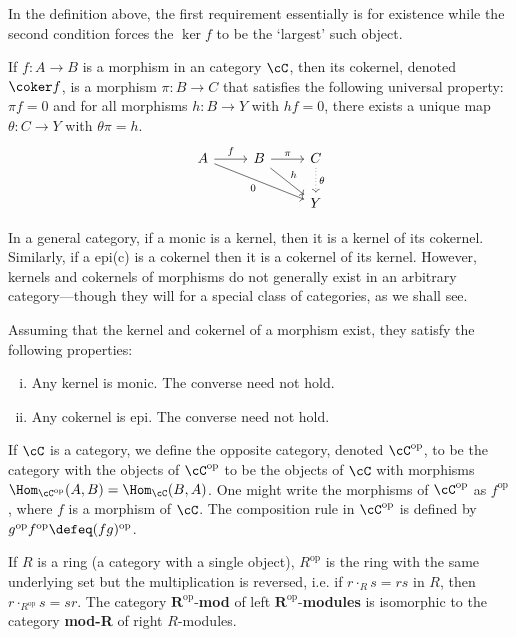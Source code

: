 \noindent In the definition above, the first requirement essentially is for existence while the second condition forces the $\ker f$ to be the `largest' such object. 


\begin{dfn}[Cokernel]
If $f: A \to B$ is a morphism in an category $\cC$, then its cokernel, denoted $\coker f$, is a morphism $\pi: B \to C$ that satisfies the following universal property: $\pi f=0$ and for all morphisms $h: B \to Y$ with $hf=0$, there exists a unique map $\theta: C \to Y$ with $\theta\pi=h$.
	\[
	\begin{tikzcd}
	A \arrow{r}{f} \arrow[swap]{rrd}{0} & B \arrow{r}{\pi} \arrow{dr}{h} & C \arrow[dotted]{d}{\theta} \\ 
	& & Y 
	\end{tikzcd}
	\]
\end{dfn}


In a general category, if a monic is a kernel, then it is a kernel of its cokernel. Similarly, if a epi(c) is a cokernel then it is a cokernel of its kernel. However, kernels and cokernels of morphisms do not generally exist in an arbitrary category---though they will for a special class of categories, as we shall see.


\begin{prop}
Assuming that the kernel and cokernel of a morphism exist, they satisfy the following properties:
	\begin{enumerate}[(i)]
	\item Any kernel is monic. The converse need not hold.
	\item Any cokernel is epi. The converse need not hold.
	\end{enumerate}
\end{prop}


\begin{dfn}
If $\cC$ is a category, we define the opposite category, denoted $\cC^{\text{op}}$, to be the category with the objects of $\cC^{\text{op}}$ to be the objects of $\cC$ with morphisms $\Hom_{\cC^{\text{op}}}(A,B)=\Hom_{\cC}(B,A)$. One might write the morphisms of $\cC^{\text{op}}$ as $f^{\text{op}}$, where $f$ is a morphism of $\cC$. The composition rule in $\cC^{\text{op}}$ is defined by $g^{\text{op}}f^{\text{op}} \defeq (fg)^{\text{op}}$. 
\end{dfn}


\begin{ex}
If $R$ is a ring (a category with a single object), $R^\text{op}$ is the ring with the same underlying set but the multiplication is reversed, i.e. if $r \cdot_R s=rs$ in $R$, then $r \cdot_{R^\text{op}} s=sr$. The category $\mathbf{R}^\text{op}$-\textbf{mod} of left $\mathbf{R}^\text{op}$-\textbf{modules} is isomorphic to the category \textbf{mod-R} of right $R$-modules. \xqed
\end{ex}


